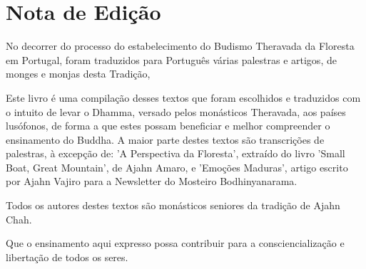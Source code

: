 \chapter{Nota de Edição}

No decorrer do processo do estabelecimento do Budismo Theravada da
Floresta em Portugal, foram traduzidos para Português várias palestras e
artigos, de monges e monjas desta Tradição,

Este livro é uma compilação desses textos que foram escolhidos e
traduzidos com o intuito de levar o Dhamma, versado pelos monásticos
Theravada, aos países lusófonos, de forma a que estes possam beneficiar
e melhor compreender o ensinamento do Buddha. A maior parte destes
textos são transcrições de palestras, à excepção de: 'A Perspectiva da
Floresta', extraído do livro 'Small Boat, Great Mountain', de Ajahn
Amaro, e 'Emoções Maduras', artigo escrito por Ajahn Vajiro para a
Newsletter do Mosteiro Bodhinyanarama.

Todos os autores destes textos são monásticos seniores da tradição de
Ajahn Chah.

Que o ensinamento aqui expresso possa contribuir para a
consciencialização e libertação de todos os seres.
